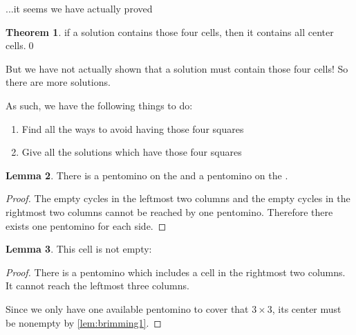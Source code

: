 \documentclass{article}
\newcommand{\authornote}[1]{\marginnote{\textcolor{authorcolor}{#1}}}
\theoremstyle{definition}%
\newtheorem{theorem}{Theorem}[section]
\newtheorem{lemma}[theorem]{Lemma}
\newcommand{\badterm}[1]{\textcolor{red}{\uwave{\textcolor{black}{#1}}}}
\begin{document}
...it seems we have actually proved\authornote{I was lost but then I figured it out. Proofs are like that.}
\begin{theorem}
if a solution contains those four cells, then it contains all center cells.\qed
\end{theorem}

But we have not actually shown that a solution must contain those four cells! So there are more solutions.

As such, we have the following things to do:
\begin{enumerate}
\item Find all the ways to avoid having those four squares
\item Give all the solutions which have those four squares
\end{enumerate}

\begin{lemma}
There is a pentomino on the \badterm{left} and a pentomino on the \badterm{right}.
\end{lemma}
\begin{proof}
The empty cycles in the leftmost two columns and the empty cycles in the rightmost two columns cannot be reached by one pentomino. Therefore there exists one pentomino for each side.
\end{proof}

\begin{lemma}\label{lem:3x9r2c2}
This cell is not empty:
\begin{center}
\end{center}
\end{lemma}
\begin{proof}
There is a pentomino which includes a cell in the rightmost two columns. It cannot
reach the leftmost three columns.

Since we only have one available pentomino to cover that $3 \times 3$, its center must be nonempty by \cref{lem:brimming1}.
\end{proof}
\end{document}
